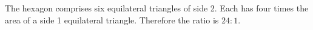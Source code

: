 The hexagon comprises six equilateral triangles of side 2. Each has four times the area of a side 1 equilateral triangle. Therefore the ratio is $\boxed{24:1}$.
